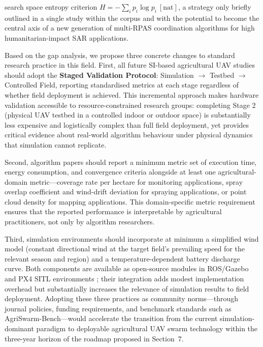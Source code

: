 \documentclass[review,3p,times]{elsarticle}
\begin{document}
search space entropy criterion $H = -\sum_i p_i \log p_i\ [\text{nat}]$, a strategy only briefly outlined in a single study within the corpus \cite{wang2025} and with the potential to become the central axis of a new generation of multi-RPAS coordination algorithms for high humanitarian-impact SAR applications.

Based on the gap analysis, we propose three concrete changes to standard research practice in this field. First, all future SI-based agricultural UAV studies should adopt the \textbf{Staged Validation Protocol}: Simulation $\rightarrow$ Testbed $\rightarrow$ Controlled Field, reporting standardised metrics at each stage regardless of whether field deployment is achieved. This incremental approach makes hardware validation accessible to resource-constrained research groups: completing Stage 2 (physical UAV testbed in a controlled indoor or outdoor space) is substantially less expensive and logistically complex than full field deployment, yet provides critical evidence about real-world algorithm behaviour under physical dynamics that simulation cannot replicate.

Second, algorithm papers should report a minimum metric set of execution time, energy consumption, and convergence criteria alongside at least one agricultural-domain metric---coverage rate per hectare for monitoring applications, spray overlap coefficient and wind-drift deviation for spraying applications, or point cloud density for mapping applications. This domain-specific metric requirement ensures that the reported performance is interpretable by agricultural practitioners, not only by algorithm researchers.

Third, simulation environments should incorporate at minimum a simplified wind model (constant directional wind at the target field's prevailing speed for the relevant season and region) and a temperature-dependent battery discharge curve. Both components are available as open-source modules in ROS/Gazebo and PX4 SITL environments \cite{shafiq2022}; their integration adds modest implementation overhead but substantially increases the relevance of simulation results to field deployment. Adopting these three practices as community norms---through journal policies, funding requirements, and benchmark standards such as AgriSwarm-Bench---would accelerate the transition from the current simulation-dominant paradigm to deployable agricultural UAV swarm technology within the three-year horizon of the roadmap proposed in Section~7.
\end{document}
